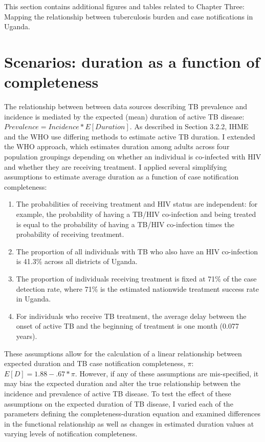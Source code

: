 \documentclass[
]{report}
\providecommand{\tightlist}{%
  \setlength{\itemsep}{0pt}\setlength{\parskip}{0pt}}
\begin{document}
This section contains additional figures and tables related to Chapter Three: Mapping the relationship between tuberculosis burden and case notifications in Uganda.

\hypertarget{scenarios-duration-as-a-function-of-completeness}{%
\section*{Scenarios: duration as a function of completeness}\label{scenarios-duration-as-a-function-of-completeness}}

The relationship between between data sources describing TB prevalence and incidence is mediated by the expected (mean) duration of active TB disease: \(Prevalence = Incidence * E[Duration]\). As described in Section 3.2.2, IHME and the WHO use differing methods to estimate active TB duration. I extended the WHO approach, which estimates duration among adults across four population groupings depending on whether an individual is co-infected with HIV and whether they are receiving treatment.\autocite{Glaziou2020} I applied several simplifying assumptions to estimate average duration as a function of case notification completeness:

\begin{enumerate}
\def\labelenumi{\arabic{enumi}.}
\tightlist
\item
  The probabilities of receiving treatment and HIV status are independent: for example, the probability of having a TB/HIV co-infection and being treated is equal to the probability of having a TB/HIV co-infection times the probability of receiving treatment.
\item
  The proportion of all individuals with TB who also have an HIV co-infection is 41.3\% across all districts of Uganda.
\item
  The proportion of individuals receiving treatment is fixed at 71\% of the case detection rate, where 71\% is the estimated nationwide treatment success rate in Uganda.
\item
  For individuals who receive TB treatment, the average delay between the onset of active TB and the beginning of treatment is one month (0.077 years).
\end{enumerate}

These assumptions allow for the calculation of a linear relationship between expected duration and TB case notification completeness, \(\pi\): \(E[D] = 1.88 - .67 * \pi\). However, if any of these assumptions are mis-specified, it may bias the expected duration and alter the true relationship between the incidence and prevalence of active TB disease. To test the effect of these assumptions on the expected duration of TB disease, I varied each of the parameters defining the completeness-duration equation and examined differences in the functional relationship as well as changes in estimated duration values at varying levels of notification completeness.
\end{document}
